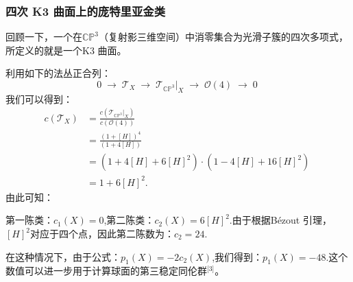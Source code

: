 \subsubsection{四次 K3 曲面上的庞特里亚金类}
回顾一下，一个在$\mathbb{CP}^3$（复射影三维空间）中消零集合为光滑子簇的四次多项式，所定义的就是一个K3 曲面。

利用如下的法丛正合列：
$$
0 \;\longrightarrow\; \mathcal{T}_X
\;\longrightarrow\; \mathcal{T}_{\mathbb{CP}^3}|_X
\;\longrightarrow\; \mathcal{O}(4)
\;\longrightarrow\; 0~
$$
我们可以得到：
$$
\begin{aligned}
c(\mathcal{T}_X)
&= \frac{c(\mathcal{T}_{\mathbb{CP}^3}|_X)}{c(\mathcal{O}(4))} \\[6pt]
&= \frac{(1 + [H])^4}{(1 + 4[H])} \\[6pt]
&= (1 + 4[H] + 6[H]^2) \cdot (1 - 4[H] + 16[H]^2) \\[6pt]
&= 1 + 6[H]^2.
\end{aligned}~
$$
由此可知：

第一陈类：$c_1(X) = 0$,第二陈类：$c_2(X) = 6[H]^2$.由于根据Bézout 引理，$[H]^2$对应于四个点，因此第二陈数为：$c_2 = 24$.

在这种情况下，由于公式：$p_1(X) = -2c_2(X)$,我们得到：$p_1(X) = -48$.这个数值可以进一步用于计算球面的第三稳定同伦群\(^\text{[3]}\)。
